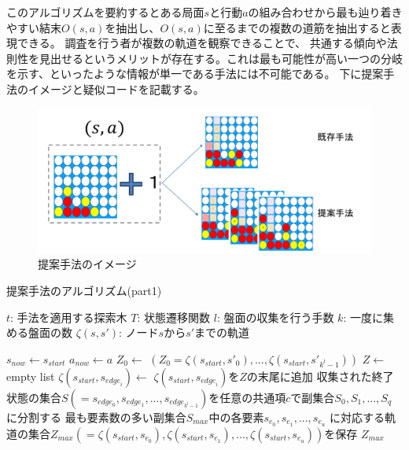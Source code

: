 このアルゴリズムを要約するとある局面$s$と行動$a$の組み合わせから最も辿り着きやすい結末$O(s, a)$を抽出し、$O(s, a)$に至るまでの複数の道筋を抽出すると表現できる。
調査を行う者が複数の軌道を観察できることで、
共通する傾向や法則性を見出せるというメリットが存在する。これは最も可能性が高い一つの分岐を示す、といったような情報が単一である手法には不可能である。
下に提案手法のイメージと疑似コードを記載する。
\begin{figure}[t]
	\centering
	\includegraphics[width=\linewidth]{./figure/merit.png}
	\caption{提案手法のイメージ}
	\label{fig:merit}
\end{figure}
\newpage
\begin{algorithm}
    \label{alg:myalg-1}
    \caption{提案手法のアルゴリズム(part1)}
    \begin{algorithmic}[1]
        \State $t$: 手法を適用する探索木
        \State $T$: 状態遷移関数
        \State $l$: 盤面の収集を行う手数
        \State $k$: 一度に集める盤面の数
        \State $\zeta(s, s')$: ノード$s$から$s'$までの軌道
        
       
           \State $s_{now}\gets s_{start}$
           \State $a_{now}\gets a$
           \State $Z_0 \gets$
           \State $(Z_0 ={\zeta(s_{start}, {s'}_0), ..., \zeta(s_{start}, {s'}_{k^l-1})})$
           \State $ Z \gets$ empty list
             \State $\zeta(s_{start}, s_{{edge}_i}) \gets$ 
             \State $\zeta(s_{start}, s_{{edge}_i})$を$Z$の末尾に追加
           \EndFor
           \State 収集された終了状態の集合$S(={s_{edge_0},s_{edge_1}, ..., s_{edge_{k^l-1}}})$を任意の共通項$c$で副集合${S_0, S_1, ..., S_q}$に分割する
           \State 最も要素数の多い副集合$S_{max}$中の各要素${s_{e_0}, s_{e_1}, ...,  s_{e_u}}$
           \State に対応する軌道の集合$Z_{max}(=\zeta(s_{start}, s_{e_0}), \zeta(s_{start}, s_{e_1}), ..., \zeta(s_{start}, s_{e_u}))$を保存
           \State \Return $Z_{max}$
        \EndFunction
    \end{algorithmic}
\end{algorithm}
